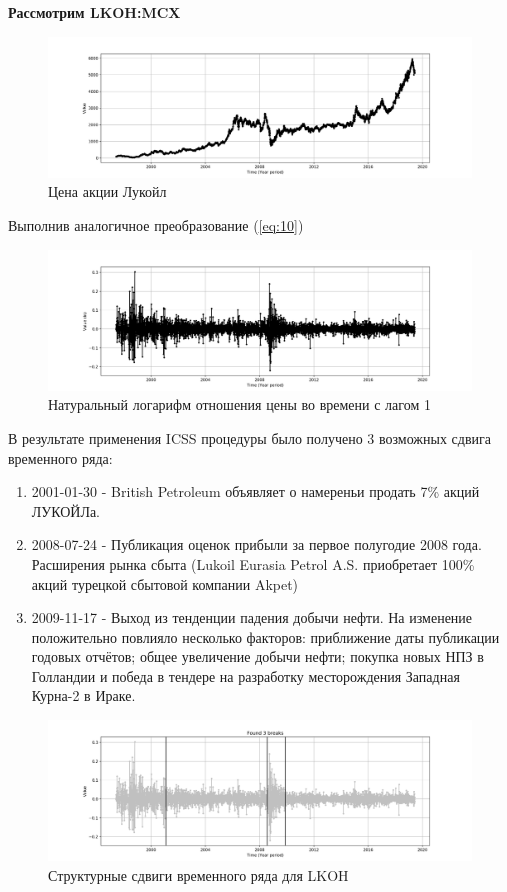 \documentclass[a4paper,14pt,russian]{extarticle}
\begin{document}
	\textbf{Рассмотрим LKOH:MCX}
	
	\begin{figure}[H]
		\includegraphics[width=\linewidth]{source_ts_LKOH.png}
		\caption{\label{fig:3} Цена акции Лукойл}
	\end{figure}
	Выполнив аналогичное преобразование (\ref{eq:10})
	\begin{figure}[H]
		\includegraphics[width=\linewidth]{source_ln_ts_LKOH.png}
		\caption{\label{fig:4} Натуральный логарифм отношения цены во времени с лагом 1}
	\end{figure}
	В результате применения ICSS процедуры было получено 3 возможных сдвига временного ряда:
	\begin{enumerate}
		\item 2001-01-30 - British Petroleum объявляет о намереньи продать 7\% акций ЛУКОЙЛа.
		\item 2008-07-24 - Публикация оценок прибыли за первое полугодие 2008 года. Расширения рынка сбыта (Lukoil Eurasia Petrol A.S. приобретает 100\% акций турецкой сбытовой компании Akpet)
		\item 2009-11-17 - Выход из тенденции падения добычи нефти. На изменение положительно повлияло несколько факторов: приближение даты публикации годовых отчётов; общее увеличение добычи нефти; покупка новых НПЗ в Голландии и победа в тендере на разработку месторождения Западная Курна-2 в Ираке.
	\end{enumerate}
	\begin{figure}[H]
		\includegraphics[width=\linewidth]{ru_stock_simulation_LKOH.png}
		\caption{\label{fig:5} Структурные сдвиги временного ряда для LKOH}
	\end{figure}
	
\end{document}
